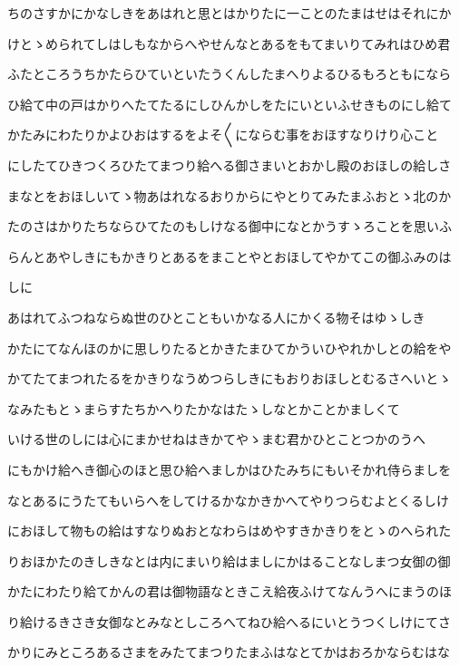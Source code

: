 \documentclass[a4paper,11pt,landscape]{ltjtarticle}
\begin{document}
ちのさすかにかなしきをあはれと思とはかりたに一ことのたまはせはそれにか
\par\medskip
けとゝめられてしはしもなからへやせんなとあるをもてまいりてみれはひめ君
\par\medskip
ふたところうちかたらひていといたうくんしたまへりよるひるもろともになら
\par\medskip
ひ給て中の戸はかりへたてたるにしひんかしをたにいといふせきものにし給て
\par\medskip
かたみにわたりかよひおはするをよそ〱にならむ事をおほすなりけり心こと
\par\medskip
にしたてひきつくろひたてまつり給へる御さまいとおかし殿のおほしの給しさ
\par\medskip
まなとをおほしいてゝ物あはれなるおりからにやとりてみたまふおとゝ北のか
\par\medskip
たのさはかりたちならひてたのもしけなる御中になとかうすゝろことを思いふ
\par\medskip
らんとあやしきにもかきりとあるをまことやとおほしてやかてこの御ふみのは
\par\medskip
しに
\par\medskip
あはれてふつねならぬ世のひとこともいかなる人にかくる物そはゆゝしき
\par\medskip
かたにてなんほのかに思しりたるとかきたまひてかういひやれかしとの給をや
\par\medskip
かてたてまつれたるをかきりなうめつらしきにもおりおほしとむるさへいとゝ
\par\medskip
なみたもとゝまらすたちかへりたかなはたゝしなとかことかましくて
\par\medskip
いける世のしには心にまかせねはきかてやゝまむ君かひとことつかのうへ
\par\medskip
にもかけ給へき御心のほと思ひ給へましかはひたみちにもいそかれ侍らましを
\par\medskip
なとあるにうたてもいらへをしてけるかなかきかへてやりつらむよとくるしけ
\par\medskip
におほして物もの給はすなりぬおとなわらはめやすきかきりをとゝのへられた
\par\medskip
りおほかたのきしきなとは内にまいり給はましにかはることなしまつ女御の御
\par\medskip
かたにわたり給てかんの君は御物語なときこえ給夜ふけてなんうへにまうのほ
\par\medskip
り給けるきさき女御なとみなとしころへてねひ給へるにいとうつくしけにてさ
\par\medskip
かりにみところあるさまをみたてまつりたまふはなとてかはおろかならむはな
\par\medskip
\end{document}
